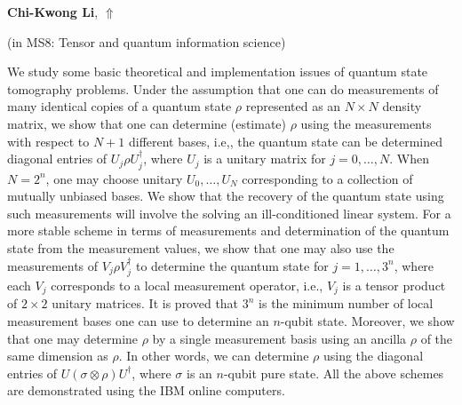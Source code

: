 \documentclass[ILAS2025-program.tex]{subfiles}
\begin{document}
\hypertarget{down0054}{}\begin{ilasabstract}
    
\textbf{Chi-Kwong Li},  \hfill \hyperlink{up0054}{$\Uparrow$}
    
    
(in {\color{mstitle}MS8: Tensor and quantum information science})
        
\mtskip
    We study some basic theoretical and implementation issues
of quantum state tomography problems.
Under the assumption that one can do 
measurements of many identical copies of a quantum state
$\rho$ represented as an $N\times N$ density matrix,
we show that one can determine (estimate) $\rho$ using the 
measurements with respect to $N+1$ different bases, 
i.e,,  the quantum state can be determined diagonal entries of 
$U_j\rho U_j^\dag$, where $U_j$ is a unitary matrix  for $j = 0, \dots, N$.
When $N = 2^n$, one may choose unitary $U_0, \dots, U_N$ corresponding
to a collection of mutually unbiased bases. We show that the recovery of the
quantum state using such measurements will involve the solving an 
ill-conditioned linear system. For a more stable scheme in terms of
measurements and determination of the quantum state from the measurement values,
we show that one may also use the measurements of 
$V_j \rho V_j^\dag$ to determine the quantum state for $j = 1, \dots, 3^n$,
where each $V_j$ corresponds to a local measurement operator,
i.e., $V_j$ is a tensor product of $2\times 2$ unitary matrices.
It is proved that $3^n$ is the minimum number of local measurement bases
one can use to determine an $n$-qubit state.
Moreover, we show that one may determine $\rho$ by a single measurement
basis using an ancilla $\rho$ of the same dimension as $\rho$.
In other words, we can determine $\rho$ using
the diagonal entries of $U(\sigma \otimes \rho)U^\dag$, where
$\sigma$ is an $n$-qubit pure state.
All the above schemes are demonstrated using the IBM online computers.

\end{ilasabstract}
    
\end{document}
